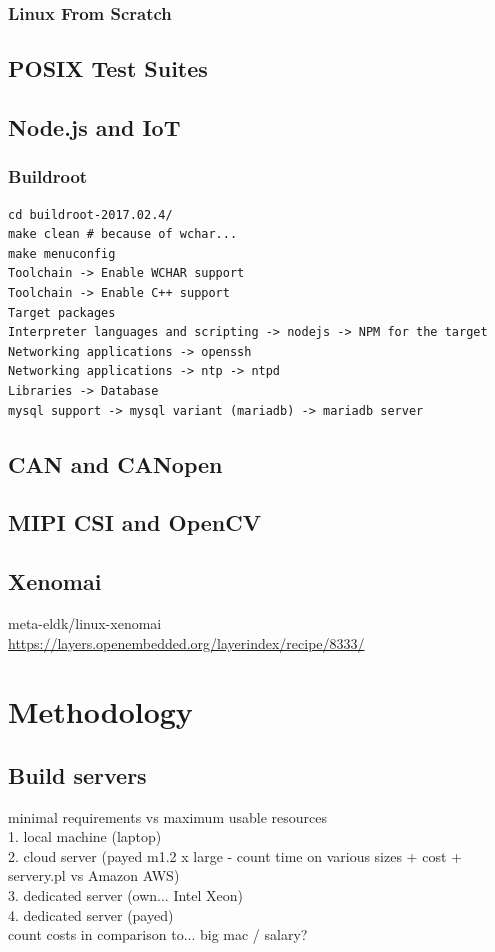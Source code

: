 \documentclass[printmode]{mgr}
\begin{document}
\subsection{Linux From Scratch}

\section{POSIX Test Suites}

\section{Node.js and IoT}

\subsection{Buildroot}

\begin{lstlisting}
cd buildroot-2017.02.4/
make clean # because of wchar...
make menuconfig
Toolchain -> Enable WCHAR support
Toolchain -> Enable C++ support
Target packages
Interpreter languages and scripting -> nodejs -> NPM for the target
Networking applications -> openssh
Networking applications -> ntp -> ntpd
Libraries -> Database
mysql support -> mysql variant (mariadb) -> mariadb server
\end{lstlisting}

\section{CAN and CANopen}

\section{MIPI CSI and OpenCV}

\section{Xenomai}

meta-eldk/linux-xenomai
\url{https://layers.openembedded.org/layerindex/recipe/8333/}

\chapter{Methodology}
\label{chapter:methodology}

\section{Build servers}
minimal requirements vs maximum usable resources\\
1. local machine (laptop)\\
2. cloud server (payed m1.2 x large - count time on various sizes + cost + servery.pl vs Amazon AWS)\\
3. dedicated server (own... Intel Xeon)\\
4. dedicated server (payed)\\
count costs in comparison to... big mac / salary?
\end{document}
